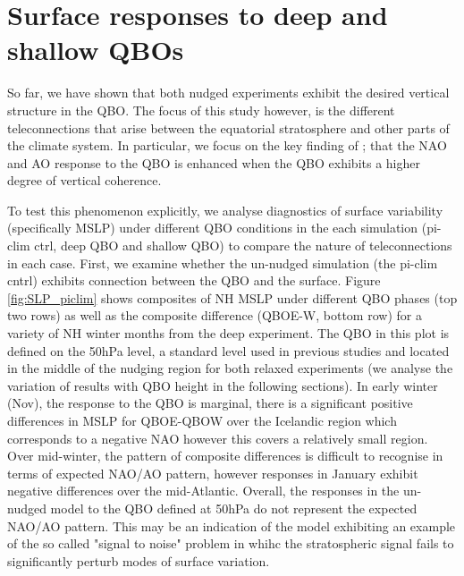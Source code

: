 

\section{Surface responses to deep and shallow QBOs}
\label{sec:vortex_responses_QBO}
So far, we have shown that both nudged experiments exhibit the desired vertical structure in the QBO. The focus of this study however, is the different teleconnections that arise between the equatorial stratosphere and other parts of the climate system. In particular, we focus on the key finding of \cite{andrewsObserved2019d}; that the NAO and AO response to the QBO is enhanced when the QBO exhibits a higher degree of vertical coherence. 

To test this phenomenon explicitly, we analyse  diagnostics of surface variability (specifically MSLP) under different QBO conditions in the each simulation (pi-clim ctrl, deep QBO and shallow QBO) to compare the nature of teleconnections in each case. First, we examine whether the un-nudged simulation (the pi-clim cntrl) exhibits connection between the QBO and the surface. Figure \ref{fig:SLP_piclim} shows composites of NH MSLP under different QBO phases (top two rows) as well as the composite difference (QBOE-W, bottom row) for a variety of NH winter months from the deep experiment. The QBO in this plot is defined on the 50hPa level, a standard level used in previous studies and located in the middle of the nudging region for both relaxed experiments (we analyse the variation of results with QBO height in the following sections). In early winter (Nov), the response to the QBO is marginal, there is a significant positive differences in MSLP for QBOE-QBOW over the Icelandic region which corresponds to a negative NAO however this covers a relatively small region. Over mid-winter, the pattern of composite differences is difficult to recognise in terms of expected NAO/AO pattern, however responses in January exhibit negative differences over the mid-Atlantic. Overall, the responses in the un-nudged model to the QBO defined at 50hPa do not represent the expected NAO/AO pattern. This may be an indication of the model exhibiting an example of the so called "signal to noise" problem in whihc the stratospheric signal fails to significantly perturb modes of surface variation. 

